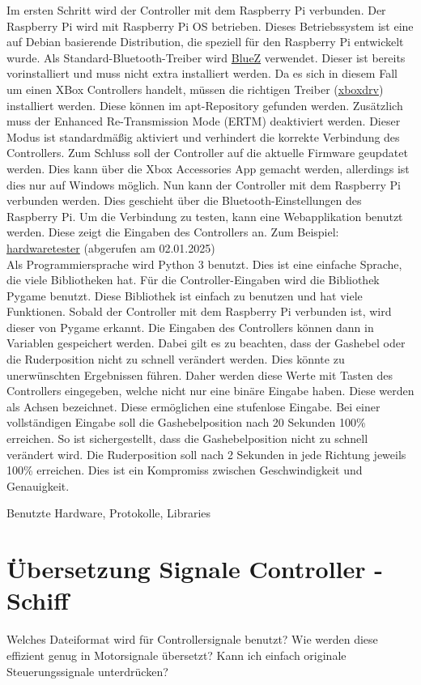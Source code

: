 Im ersten Schritt wird der Controller mit dem Raspberry Pi verbunden. Der Raspberry Pi wird mit Raspberry Pi OS betrieben. 
Dieses Betriebssystem ist eine auf Debian basierende Distribution, die speziell für den Raspberry Pi entwickelt wurde.
Als Standard-Bluetooth-Treiber wird \href{https://www.bluez.org/}{BlueZ} verwendet. Dieser ist bereits vorinstalliert und muss 
nicht extra installiert werden. Da es sich in diesem Fall um einen XBox Controllers handelt, müssen die richtigen Treiber
(\href{https://github.com/xboxdrv/xboxdrv}{xboxdrv}) installiert werden. Diese können im apt-Repository gefunden werden.
Zusätzlich muss der Enhanced Re-Transmission Mode (ERTM) deaktiviert werden. Dieser Modus ist standardmäßig aktiviert und
verhindert die korrekte Verbindung des Controllers. Zum Schluss soll der Controller auf die aktuelle Firmware geupdatet werden.
Dies kann über die Xbox Accessories App gemacht werden, allerdings ist dies nur auf Windows möglich. Nun kann 
der Controller mit dem Raspberry Pi verbunden werden. Dies geschieht über die Bluetooth-Einstellungen des Raspberry Pi.
Um die Verbindung zu testen, kann eine Webapplikation benutzt werden. Diese zeigt die Eingaben des Controllers an. Zum 
Beispiel: \href{https://hardwaretester.com/gamepad}{hardwaretester} (abgerufen am 02.01.2025) 
\\
Als Programmiersprache wird Python 3 benutzt. Dies ist eine einfache Sprache, die viele Bibliotheken hat. Für die
Controller-Eingaben wird die Bibliothek Pygame benutzt. Diese Bibliothek ist einfach zu benutzen und hat viele Funktionen.
Sobald der Controller mit dem Raspberry Pi verbunden ist, wird dieser von Pygame erkannt. Die Eingaben des Controllers
können dann in Variablen gespeichert werden. Dabei gilt es zu beachten, dass der Gashebel oder die Ruderposition nicht
zu schnell verändert werden. Dies könnte zu unerwünschten Ergebnissen führen. Daher werden diese Werte mit Tasten des
Controllers eingegeben, welche nicht nur eine binäre Eingabe haben. Diese werden als Achsen bezeichnet. Diese ermöglichen
eine stufenlose Eingabe. Bei einer vollständigen Eingabe soll die Gashebelposition nach 20 Sekunden 100\% erreichen.
So ist sichergestellt, dass die Gashebelposition nicht zu schnell verändert wird. Die Ruderposition soll nach 2 Sekunden
in jede Richtung jeweils 100\% erreichen. Dies ist ein Kompromiss zwischen Geschwindigkeit und Genauigkeit.


Benutzte Hardware, Protokolle, Libraries 

\section{Übersetzung Signale Controller - Schiff}
Welches Dateiformat wird für Controllersignale benutzt?
Wie werden diese effizient genug in Motorsignale übersetzt?
Kann ich einfach originale Steuerungssignale unterdrücken?

